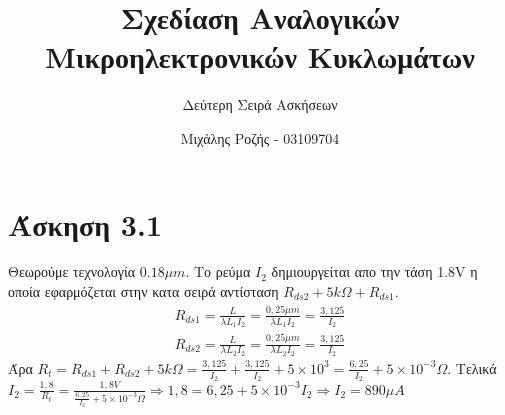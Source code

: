 \documentclass[a4paper,11pt]{scrartcl}
\author{Μιχάλης Ροζής - 03109704}
\title{Σχεδίαση Αναλογικών Μικροηλεκτρονικών Κυκλωμάτων}
\date{}
\subtitle{Δεύτερη Σειρά Ασκήσεων}
\begin{document}
\maketitle
\section*{Άσκηση 3.1}
Θεωρούμε τεχνολογία $0.18\mu{m}$.
Το ρεύμα $I_2$ δημιουργείται απο την τάση 1.8V η οποία εφαρμόζεται στην κατα σειρά αντίσταση $R_{ds2} + 5k\Omega + R_{ds1}$.
\begin{gather}
		R_{ds1} = \frac{L}{\lambda L_1I_2} =\frac{0,25\mu{m}}{\lambda L_1I_2} = \frac{3,125}{I_2} \\
		R_{ds2} = \frac{L}{\lambda L_2I_2} =\frac{0,25\mu{m}}{\lambda L_2I_2} = \frac{3,125}{I_2}
\end{gather}
Άρα $R_{t} = R_{ds1} + R_{ds2} + 5k\Omega = \frac{3,125}{I_2} + \frac{3,125}{I_2} + 5\times 10^3 = \frac{6,25}{I_2} + 5\times10^{-3} \Omega $.
Τελικά $I_2 = \frac{1,8}{R_t} = \frac{1,8V}{\frac{6,25}{I_2}+5\times10^{-3} \Omega} \Rightarrow 1,8 = 6,25 + 5\times10^{-3}I_2 \Rightarrow I_2 = 890\mu A$
\end{document}
